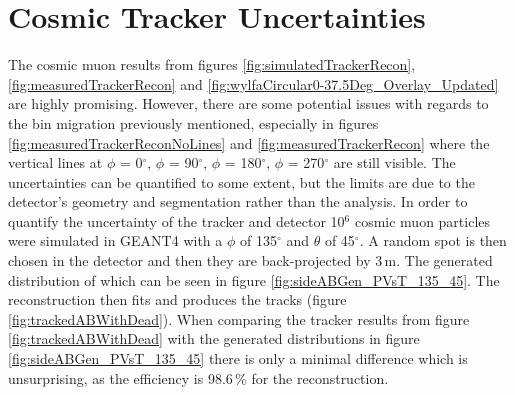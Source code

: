 \section{Cosmic Tracker Uncertainties}\label{sec:cosmicTrackerUncertainties}
The cosmic muon results from figures \ref{fig:simulatedTrackerRecon}, \ref{fig:measuredTrackerRecon} and \ref{fig:wylfaCircular0-37.5Deg_Overlay_Updated} are highly promising. However, there are some potential issues with regards to the bin migration previously mentioned, especially in figures \ref{fig:measuredTrackerReconNoLines} and \ref{fig:measuredTrackerRecon} where the vertical lines at $\phi$ = 0$^\circ$, $\phi$ = 90$^\circ$, $\phi$ = 180$^\circ$, $\phi$ = 270$^\circ$ are still visible. The uncertainties can be quantified to some extent, but the limits are due to the detector's geometry and segmentation rather than the analysis. In order to quantify the uncertainty of the tracker and detector 10$^6$ cosmic muon particles were simulated in GEANT4 with a $\phi$ of  135$^\circ$ and $\theta$ of 45$^\circ$. A random spot is then chosen in the detector and then they are back-projected by 3\,m. The generated distribution of which can be seen in figure \ref{fig:sideABGen_PVsT_135_45}. The reconstruction then fits and produces the tracks (figure \ref{fig:trackedABWithDead}). When comparing the tracker results from figure \ref{fig:trackedABWithDead} with the generated distributions in figure \ref{fig:sideABGen_PVsT_135_45} there is only a minimal difference which is unsurprising, as the efficiency is 98.6\,\% for the reconstruction. 

